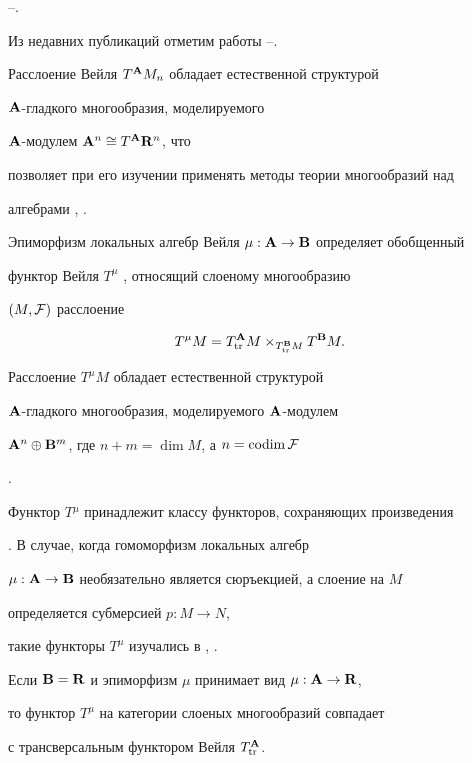 \cite{Shir3}--\cite{Vish}.


Из недавних публикаций отметим работы \cite{Mik2}--\cite{MRM}.


Расслоение Вейля $T^{\bold A}M_n$ обладает естественной структурой


${\bold A}$-гладкого многообразия, моделируемого\linebreak


${\bold A}$-модулем ${\bold A}^n\cong T^{\bold A}{\bold R}^n$, что


позволяет при его изучении применять методы теории многообразий над


алгебрами \cite{Shir3}, \cite{VSh31}.





Эпиморфизм локальных алгебр Вейля $\mu:{\bold A}\to{\bold B}$ определяет обобщенный


функтор Вейля $T^\mu$ \cite{ShS}, относящий слоеному многообразию


$(M, {\cal F})$ расслоение


\begin{equation}


\label{tmu}


T^\mu M=T_{\tr}^{\bold A}M\times_{T_{\tr}^{\bold B}M}T^{\bold B}M.


\end{equation}


Расслоение $T^\mu M$ обладает естественной структурой


${\bold A}$-гладкого многообразия, моделируемого ${\bold A}$-модулем


${\bold A}^n\oplus{\bold B}^m$, где $n+m=\dim M$, а $n=\operatorname{codim}{\cal F}$


\cite{ShS}.


Функтор $T{^\mu}$ принадлежит классу функторов, сохраняющих произведения


\cite{KMS}. В случае, когда гомоморфизм локальных алгебр


$\mu:{\bold A}\to{\bold B}$ необязательно является сюръекцией, а слоение на $M$


определяется субмерсией $p:M\to N$,


такие функторы $T^\mu$ изучались в \cite{Mik2}, \cite{Tom}.





Если ${\bold B}={\bold R}$ и эпиморфизм $\mu$ принимает вид $\mu:{\bold A}\to{\bold R}$,


то функтор $T^\mu$ на категории слоеных многообразий совпадает


с трансверсальным функтором Вейля $T^{{\bold A}}_{\operatorname{tr}}$.


